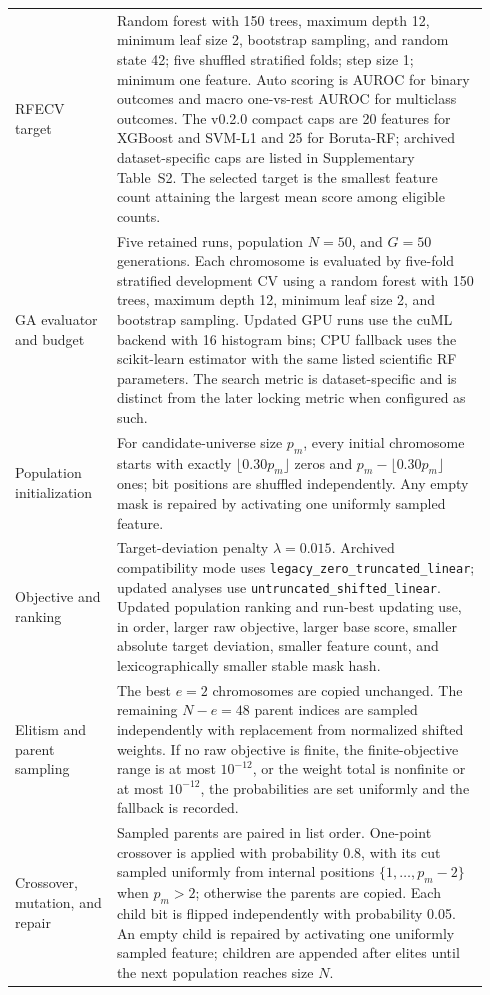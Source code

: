 {\begin{longtable}{@{}>{\raggedright\arraybackslash}p{0.205\linewidth}>{\raggedright\arraybackslash}p{0.735\linewidth}@{}}
RFECV target & Random forest with 150 trees, maximum depth 12, minimum leaf size 2, bootstrap sampling, and random state 42; five shuffled stratified folds; step size 1; minimum one feature. Auto scoring is AUROC for binary outcomes and macro one-vs-rest AUROC for multiclass outcomes. The v0.2.0 compact caps are 20 features for XGBoost and SVM-L1 and 25 for Boruta-RF; archived dataset-specific caps are listed in Supplementary Table~S2. The selected target is the smallest feature count attaining the largest mean score among eligible counts. \\
GA evaluator and budget & Five retained runs, population $N=50$, and $G=50$ generations. Each chromosome is evaluated by five-fold stratified development CV using a random forest with 150 trees, maximum depth 12, minimum leaf size 2, and bootstrap sampling. Updated GPU runs use the cuML backend with 16 histogram bins; CPU fallback uses the scikit-learn estimator with the same listed scientific RF parameters. The search metric is dataset-specific and is distinct from the later locking metric when configured as such. \\
Population initialization & For candidate-universe size $p_m$, every initial chromosome starts with exactly $\lfloor0.30p_m\rfloor$ zeros and $p_m-\lfloor0.30p_m\rfloor$ ones; bit positions are shuffled independently. Any empty mask is repaired by activating one uniformly sampled feature. \\
Objective and ranking & Target-deviation penalty $\lambda=0.015$. Archived compatibility mode uses \texttt{legacy\_zero\_truncated\_linear}; updated analyses use \texttt{untruncated\_shifted\_linear}. Updated population ranking and run-best updating use, in order, larger raw objective, larger base score, smaller absolute target deviation, smaller feature count, and lexicographically smaller stable mask hash. \\
Elitism and parent sampling & The best $e=2$ chromosomes are copied unchanged. The remaining $N-e=48$ parent indices are sampled independently with replacement from normalized shifted weights. If no raw objective is finite, the finite-objective range is at most $10^{-12}$, or the weight total is nonfinite or at most $10^{-12}$, the probabilities are set uniformly and the fallback is recorded. \\
Crossover, mutation, and repair & Sampled parents are paired in list order. One-point crossover is applied with probability 0.8, with its cut sampled uniformly from internal positions $\{1,\ldots,p_m-2\}$ when $p_m>2$; otherwise the parents are copied. Each child bit is flipped independently with probability 0.05. An empty child is repaired by activating one uniformly sampled feature; children are appended after elites until the next population reaches size $N$. \\

\end{longtable}}
